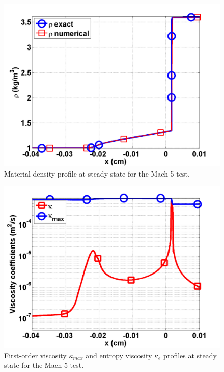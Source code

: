 \documentclass[review]{elsarticle}
\begin{document}
\begin{figure}[H]
                \centering
                \includegraphics[width=\textwidth]{figs/Mach_5_nel_2000_density.png}
        \caption{Material density profile at steady state for the Mach 5 test.}\label{fig:Mach5_density}
\end{figure}
\begin{figure}[H]
                \centering
                \includegraphics[width=\textwidth]{figs/Mach_5_nel_2000_viscosity.png}
        \caption{First-order viscosity $\kappa_{max}$ and entropy viscosity $\kappa_e$ profiles at steady state for the Mach 5 test.}\label{fig:Mach5_viscosity}
\end{figure}
\end{document}
